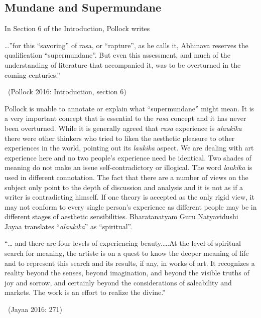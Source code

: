 \subsection*{Mundane and Supermundane}

In Section 6 of the Introduction, Pollock writes

\begin{myquote}
…”for this “savoring” of rasa, or “rapture”, as he calls it, Abhinava reserves the qualification “supermundane”. But even this assessment, and much of the understanding of literature that accompanied it, was to be overturned in the coming centuries.” 

~\hfill (Pollock 2016: Introduction, section 6)
\end{myquote}

Pollock is unable to annotate or explain what “supermundane” might mean. It is a very important concept that is essential to the \textit{rasa} concept and it has never been overturned. While it is generally agreed that \textit{rasa} experience is \textit{alaukika} there were other thinkers who tried to liken the aesthetic pleasure to other experiences in the world, pointing out its \textit{laukika} aspect. We are dealing with art experience here and no two people’s experience need be identical. Two shades of meaning do not make an issue self-contradictory or illogical. The word \textit{laukika} is used in different connotation. The fact that there are a number of views on the subject only point to the depth of discussion and analysis and it is not as if a writer is contradicting himself. If one theory is accepted as the only rigid view, it may not conform to every single person’s experience as different people may be in different stages of aesthetic sensibilities. Bharatanatyam Guru Natyavidushi Jayaa translates “\textit{alaukika}” as “spiritual”.

\begin{myquote}
“… and there are four levels of experiencing beauty.….At the level of spiritual search for meaning, the artiste is on a quest to know the deeper meaning of life and to represent this search and its results, if any, in works of art. It recognizes a reality beyond the senses, beyond imagination, and beyond the visible truths of joy and sorrow, and certainly beyond the considerations of saleability and markets. The work is an effort to realize the divine.” 

~\hfill (Jayaa 2016: 271)
\end{myquote}

